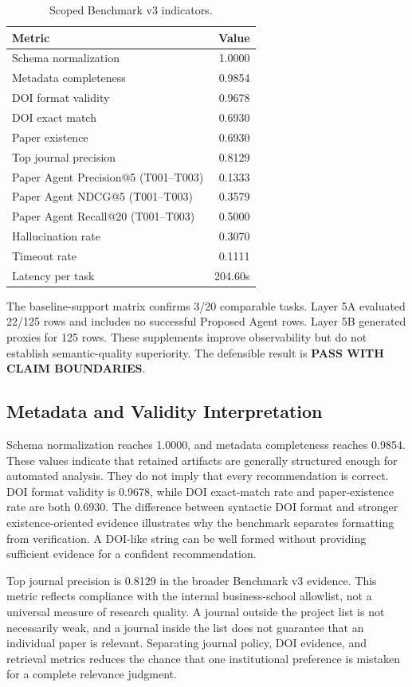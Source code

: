 \documentclass[10pt,twocolumn]{article}
\begin{document}
\begin{table}[t]\centering\footnotesize
\begin{tabular}{lr}\toprule Metric & Value \\\midrule
Schema normalization & 1.0000 \\
Metadata completeness & 0.9854 \\
DOI format validity & 0.9678 \\
DOI exact match & 0.6930 \\
Paper existence & 0.6930 \\
Top journal precision & 0.8129 \\
Paper Agent Precision@5 (T001--T003) & 0.1333 \\
Paper Agent NDCG@5 (T001--T003) & 0.3579 \\
Paper Agent Recall@20 (T001--T003) & 0.5000 \\
Hallucination rate & 0.3070 \\
Timeout rate & 0.1111 \\
Latency per task & 204.60s \\
\bottomrule\end{tabular}\caption{Scoped Benchmark v3 indicators.}\label{tab:v3summary}\end{table}
The baseline-support matrix confirms 3/20 comparable tasks. Layer 5A evaluated 22/125 rows and includes no successful Proposed Agent rows. Layer 5B generated proxies for 125 rows. These supplements improve observability but do not establish semantic-quality superiority. The defensible result is \textbf{PASS WITH CLAIM BOUNDARIES}.


\subsection{Metadata and Validity Interpretation}
Schema normalization reaches 1.0000, and metadata completeness reaches 0.9854. These values indicate that retained artifacts are generally structured enough for automated analysis. They do not imply that every recommendation is correct. DOI format validity is 0.9678, while DOI exact-match rate and paper-existence rate are both 0.6930. The difference between syntactic DOI format and stronger existence-oriented evidence illustrates why the benchmark separates formatting from verification. A DOI-like string can be well formed without providing sufficient evidence for a confident recommendation.

Top journal precision is 0.8129 in the broader Benchmark v3 evidence. This metric reflects compliance with the internal business-school allowlist, not a universal measure of research quality. A journal outside the project list is not necessarily weak, and a journal inside the list does not guarantee that an individual paper is relevant. Separating journal policy, DOI evidence, and retrieval metrics reduces the chance that one institutional preference is mistaken for a complete relevance judgment.
\end{document}
